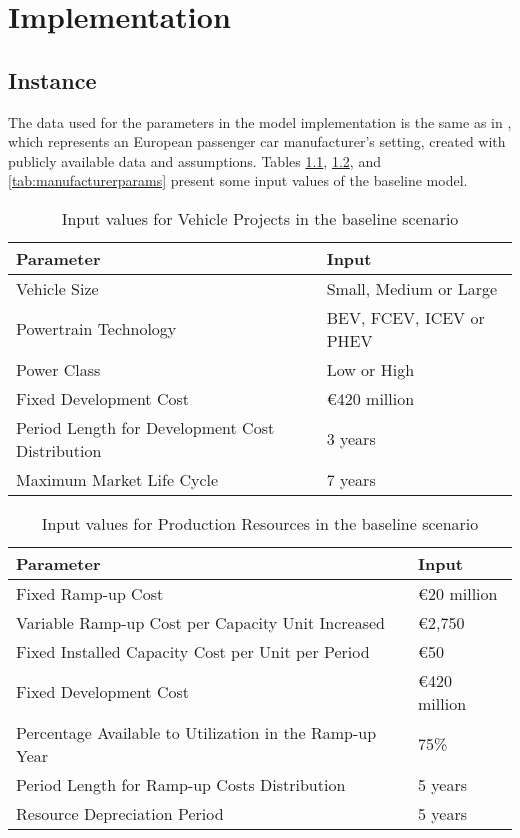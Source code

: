 \chapter{Implementation}\label{chapter:Implementation}
\section{Instance}\label{section:Data}
The data used for the parameters in the model implementation is the same as in \cite{mainreference_thies}, which represents an European passenger car manufacturer's setting, created with publicly available data and assumptions. Tables \ref{tab:vehicleprojectsparams}, \ref{tab:resourcesparams}, and \ref{tab:manufacturerparams} present some input values of the baseline model.
\begin{table}[h]
\centering
\begin{tabular}{l|l}
\toprule
Parameter&Input\\
\midrule
Vehicle Size&Small, Medium or Large \\
Powertrain Technology&BEV, FCEV, ICEV or PHEV\\
Power Class&Low or High\\
Fixed Development Cost&\euro{420} million\\
Period Length for Development Cost Distribution&3 years\\
Maximum Market Life Cycle&7 years\\
\bottomrule
\end{tabular}
\caption{Input values for Vehicle Projects in the baseline scenario}\label{tab:vehicleprojectsparams}
\end{table}
\begin{table}[h]
\centering
\begin{tabular}{l|l}
\toprule
Parameter&Input\\
\midrule
Fixed Ramp-up Cost&\euro{20} million \\
Variable Ramp-up Cost per Capacity Unit Increased&\euro{2,750}\\
Fixed Installed Capacity Cost per Unit per Period&\euro{50}\\
Fixed Development Cost&\euro{420} million\\
Percentage Available to Utilization in the Ramp-up Year&75\%\\
Period Length for Ramp-up Costs Distribution&5 years\\
Resource Depreciation Period&5 years\\
\bottomrule
\end{tabular}
\caption{Input values for Production Resources in the baseline scenario}\label{tab:resourcesparams}
\end{table}

